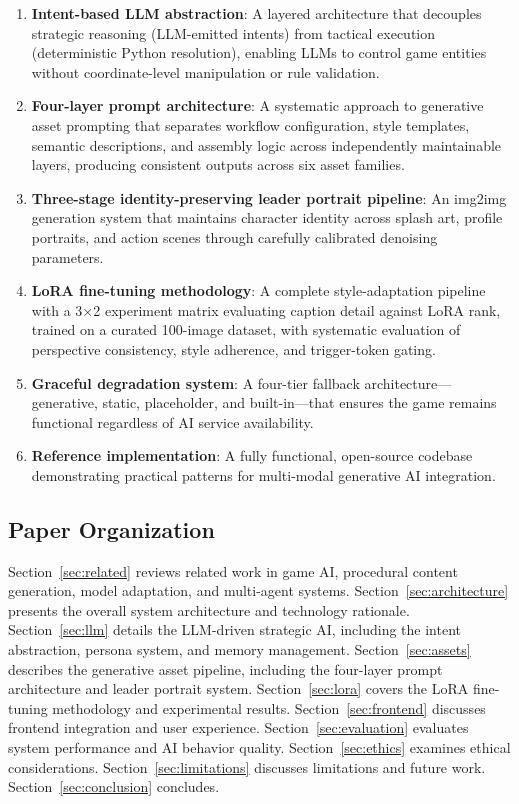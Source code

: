 \documentclass[conference]{IEEEtran}
\begin{document}
\begin{enumerate}
\item \textbf{Intent-based LLM abstraction}: A layered architecture that
  decouples strategic reasoning (LLM-emitted intents) from tactical
  execution (deterministic Python resolution), enabling LLMs to control
  game entities without coordinate-level manipulation or rule validation.

\item \textbf{Four-layer prompt architecture}: A systematic approach to
  generative asset prompting that separates workflow configuration, style
  templates, semantic descriptions, and assembly logic across independently
  maintainable layers, producing consistent outputs across six asset
  families.

\item \textbf{Three-stage identity-preserving leader portrait pipeline}: An
  img2img generation system that maintains character identity across splash
  art, profile portraits, and action scenes through carefully calibrated
  denoising parameters.

\item \textbf{LoRA fine-tuning methodology}: A complete style-adaptation
  pipeline with a 3$\times$2 experiment matrix evaluating caption detail
  against LoRA rank, trained on a curated 100-image dataset, with
  systematic evaluation of perspective consistency, style adherence, and
  trigger-token gating.

\item \textbf{Graceful degradation system}: A four-tier fallback
  architecture---generative, static, placeholder, and built-in---that
  ensures the game remains functional regardless of AI service availability.

\item \textbf{Reference implementation}: A fully functional, open-source
  codebase demonstrating practical patterns for multi-modal generative AI
  integration.
\end{enumerate}

\subsection{Paper Organization}
\label{sec:organization}

Section~\ref{sec:related} reviews related work in game AI, procedural
content generation, model adaptation, and multi-agent systems.
Section~\ref{sec:architecture} presents the overall system architecture and
technology rationale. Section~\ref{sec:llm} details the LLM-driven strategic
AI, including the intent abstraction, persona system, and memory
management. Section~\ref{sec:assets} describes the generative asset
pipeline, including the four-layer prompt architecture and leader portrait
system. Section~\ref{sec:lora} covers the LoRA fine-tuning methodology and
experimental results. Section~\ref{sec:frontend} discusses frontend
integration and user experience. Section~\ref{sec:evaluation} evaluates
system performance and AI behavior quality. Section~\ref{sec:ethics}
examines ethical considerations. Section~\ref{sec:limitations} discusses
limitations and future work. Section~\ref{sec:conclusion} concludes.
\end{document}
